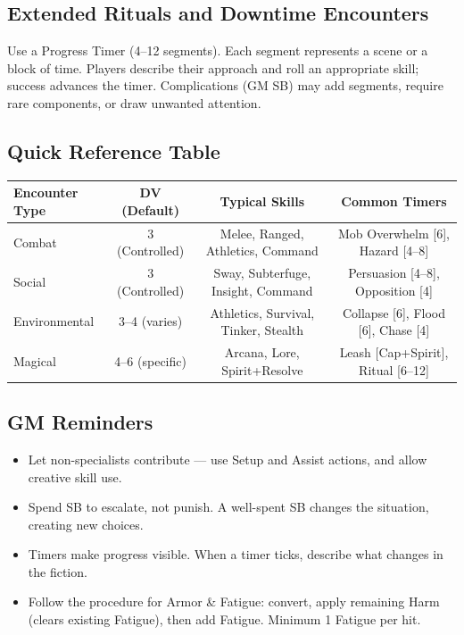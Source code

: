 \subsection{Extended Rituals and Downtime Encounters}

Use a Progress Timer (4--12 segments). Each segment represents a scene or a block of time. Players describe their approach and roll an appropriate skill; success advances the timer. Complications (GM SB) may add segments, require rare components, or draw unwanted attention.

\subsection{Quick Reference Table}

\begin{tabular}{@{}lccc@{}}
\toprule
\textbf{Encounter Type} & \textbf{DV (Default)} & \textbf{Typical Skills} & \textbf{Common Timers} \\
\midrule
Combat & 3 (Controlled) & Melee, Ranged, Athletics, Command & Mob Overwhelm [6], Hazard [4--8] \\
Social & 3 (Controlled) & Sway, Subterfuge, Insight, Command & Persuasion [4--8], Opposition [4] \\
Environmental & 3--4 (varies) & Athletics, Survival, Tinker, Stealth & Collapse [6], Flood [6], Chase [4] \\
Magical & 4--6 (specific) & Arcana, Lore, Spirit+Resolve & Leash [Cap+Spirit], Ritual [6--12] \\
\bottomrule
\end{tabular}

\subsection{GM Reminders}

\begin{itemize}
  \item Let non-specialists contribute --- use Setup and Assist actions, and allow creative skill use.
  \item Spend SB to escalate, not punish. A well-spent SB changes the situation, creating new choices.
  \item Timers make progress visible. When a timer ticks, describe what changes in the fiction.
  \item Follow the procedure for Armor \& Fatigue: convert, apply remaining Harm (clears existing Fatigue), then add Fatigue. Minimum 1 Fatigue per hit.
\end{itemize}
